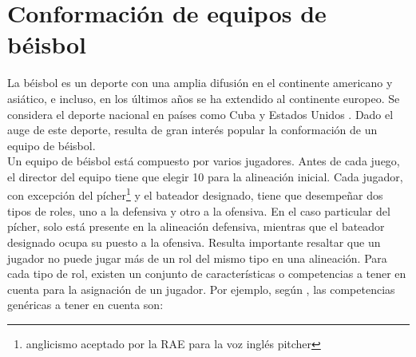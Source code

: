 \section{Conformación de equipos de béisbol} \label{ej-pel}

La béisbol es un deporte con una amplia difusión en el continente americano y asiático, e incluso, en los últimos años se ha extendido al continente europeo. Se considera el deporte nacional en países como Cuba y Estados Unidos \cite{INEFI2020}. Dado el auge de este deporte, resulta de gran interés popular la conformación de un equipo de béisbol.\\

Un equipo de béisbol está compuesto por varios jugadores. Antes de cada juego, el director del equipo tiene que elegir 10 para la alineación inicial. Cada jugador, con excepción del pícher\footnote{anglicismo aceptado por la RAE para la voz inglés pitcher} y el bateador designado, tiene que desempeñar dos tipos de roles, uno a la defensiva y otro a la ofensiva. En el caso particular del pícher, solo está presente en la alineación defensiva, mientras que el bateador designado ocupa su puesto a la ofensiva. Resulta importante resaltar que un jugador no puede jugar más de un rol del mismo tipo en una alineación. Para cada tipo de rol, existen un conjunto de características o competencias a tener en cuenta para la asignación de un jugador. Por ejemplo, según \cite{Smith1995},  las competencias genéricas a tener en cuenta son:

